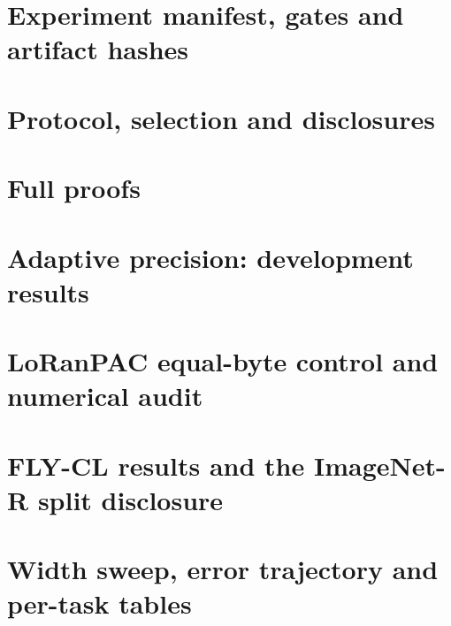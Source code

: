 \documentclass{article}
\begin{document}
\section{Experiment manifest, gates and artifact hashes}\label{app:manifest}

\section{Protocol, selection and disclosures}\label{app:protocol}

\section{Full proofs}\label{app:proofs}

\section{Adaptive precision: development results}\label{app:adaptive}

\section{LoRanPAC equal-byte control and numerical audit}\label{app:loranpac}

\section{FLY-CL results and the ImageNet-R split disclosure}\label{app:imagenetr}

\section{Width sweep, error trajectory and per-task tables}\label{app:tables}
\end{document}
